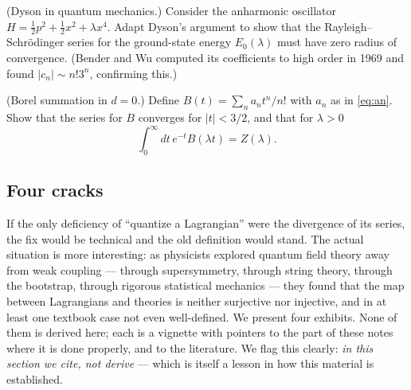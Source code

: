 \begin{exercise}[classic]
\label{exr:dyson-qm}
(Dyson in quantum mechanics.) Consider the anharmonic oscillator $H =
\frac{1}{2}p^2 + \frac{1}{2}x^2 + \lambda x^4$. Adapt Dyson's argument to show
that the Rayleigh--Schr\"odinger series for the ground-state energy
$E_0(\lambda)$ must have zero radius of convergence. (Bender and Wu computed its
coefficients to high order in 1969 and found $|c_n| \sim n!3^n$, confirming
this.)
\end{exercise}

\begin{exercise}[medium]
\label{exr:borel}
(Borel summation in $d=0$.) Define $B(t) = \sum_n a_n t^n/n!$ with $a_n$ as in
\eqref{eq:an}. Show that the series for $B$ converges for $|t| < 3/2$, and that
for $\lambda > 0$
\begin{equation*}
\int_0^\infty dt\, e^{-t} B(\lambda t) = Z(\lambda).
\end{equation*}
\end{exercise}

\subsection{Four cracks}
\label{sec:four-cracks}

If the only deficiency of ``quantize a Lagrangian'' were the divergence of its
series, the fix would be technical and the old definition would stand. The
actual situation is more interesting: as physicists explored quantum field
theory away from weak coupling --- through supersymmetry, through string theory,
through the bootstrap, through rigorous statistical mechanics --- they found
that the map between Lagrangians and theories is neither surjective nor
injective, and in at least one textbook case not even well-defined. We present
four exhibits. None of them is derived here; each is a vignette with pointers to
the part of these notes where it is done properly, and to the literature. We
flag this clearly: \emph{in this section we cite, not derive} --- which is
itself a lesson in how this material is established.

